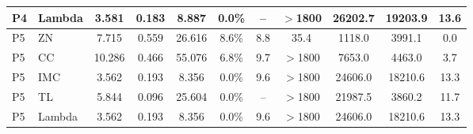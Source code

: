 \begin{tabular}{@{}llccccccccc@{}}
P4 & Lambda & 3.581 & 0.183 & 8.887 & 0.0\% & -- & $>$1800 & 26202.7 & 19203.9 & 13.6 \\
\midrule
P5 & ZN & 7.715 & 0.559 & 26.616 & 8.6\% & 8.8 & 35.4 & 1118.0 & 3991.1 & 0.0 \\
P5 & CC & 10.286 & 0.466 & 55.076 & 6.8\% & 9.7 & $>$1800 & 7653.0 & 4463.0 & 3.7 \\
P5 & IMC & 3.562 & 0.193 & 8.356 & 0.0\% & 9.6 & $>$1800 & 24606.0 & 18210.6 & 13.3 \\
P5 & TL & 5.844 & 0.096 & 25.604 & 0.0\% & -- & $>$1800 & 21987.5 & 3860.2 & 11.7 \\
P5 & Lambda & 3.562 & 0.193 & 8.356 & 0.0\% & 9.6 & $>$1800 & 24606.0 & 18210.6 & 13.3 \\
\bottomrule
\end{tabular}
